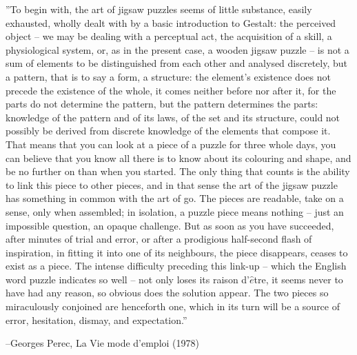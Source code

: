 

\vspace*{\fill}



''To begin with, the art of jigsaw puzzles seems of little substance, easily exhausted, wholly dealt with by a basic introduction to Gestalt: the perceived object -- we may be dealing with a perceptual act, the acquisition of a skill, a physiological system, or, as in the present case, a wooden jigsaw puzzle -- is not a sum of elements to be distinguished from each other and analysed discretely, but a pattern, that is to say a form, a structure: the element's existence does not precede the existence of the whole, it comes neither before nor after it, for the parts do not determine the pattern, but the pattern determines the parts: knowledge of the pattern and of its laws, of the set and its structure, could not possibly be derived from discrete knowledge of the elements that compose it. That means that you can look at a piece of a puzzle for three whole days, you can believe that you know all there is to know about its colouring and shape, and be no further on than when you started. The only thing that counts is the ability to link this piece to other pieces, and in that sense the art of the jigsaw puzzle has something in common with the art of go. The pieces are readable, take on a sense, only when assembled; in isolation, a puzzle piece means nothing -- just an impossible question, an opaque challenge. But as soon as you have succeeded, after minutes of trial and error, or after a prodigious half-second flash of inspiration, in fitting it into one of its neighbours, the piece disappears, ceases to exist as a piece. The intense difficulty preceding this link-up -- which the English word puzzle indicates so well -- not only loses its raison d'$\hat{e}$tre, it seems never to have had any reason, so obvious does the solution appear. The two pieces so miraculously conjoined are henceforth one, which in its turn will be a source of error, hesitation, dismay, and expectation.''
\\
\begin{flushright}
--Georges Perec, La Vie mode d'emploi (1978)
\end{flushright}
\vspace*{\fill}
